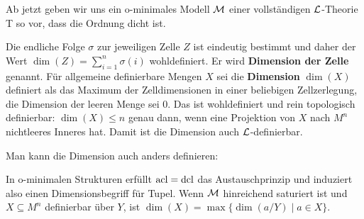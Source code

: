Ab jetzt geben wir uns ein o-minimales Modell $\mathcal{M}$ einer vollständigen $\mathcal{L}$-Theorie T so vor, dass die Ordnung dicht ist.
\begin{lemdef}
	Die endliche Folge $\sigma$ zur jeweiligen Zelle $Z$ ist eindeutig bestimmt und daher der Wert $\dim(Z)=\sum\limits_{i=1}^n\sigma(i)$ wohldefiniert. Er wird \textbf{Dimension der Zelle} genannt. Für allgemeine definierbare Mengen $X$ sei die \textbf{Dimension} $\dim(X)$ definiert als das Maximum der Zelldimensionen in einer beliebigen Zellzerlegung, die Dimension der leeren Menge sei 0. Das ist wohldefiniert und rein topologisch definierbar: $\dim(X)\leq n$ genau dann, wenn eine Projektion von $X$ nach $M^n$ nichtleeres Inneres hat. Damit ist die Dimension auch $\mathcal{L}$-definierbar.
\end{lemdef}

Man kann die Dimension auch anders definieren:
\begin{lemma}
	In o-minimalen Strukturen erfüllt $\operatorname{acl}=\operatorname{dcl}$ das Austauschprinzip und induziert also einen Dimensionsbegriff für Tupel. Wenn $\mathcal{M}$ hinreichend saturiert ist und $X\subseteq M^n$ definierbar über $Y$, ist $\dim(X)=\max\{\dim(a/Y)\mid a\in X\}$.
\end{lemma}

